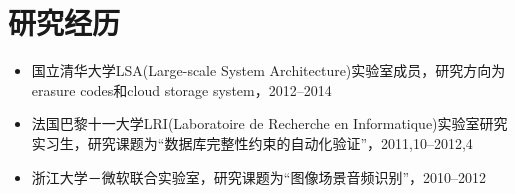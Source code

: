 \documentclass[letterpaper]{article}
\begin{document}
\section*{研究经历}

\begin{itemize}
\item 国立清华大学LSA(Large-scale System Architecture)实验室成员，研究方向为erasure codes和cloud storage system，2012--2014
\item 法国巴黎十一大学LRI(Laboratoire de Recherche en Informatique)实验室研究实习生，研究课题为“数据库完整性约束的自动化验证”，2011,10--2012,4
\item 浙江大学－微软联合实验室，研究课题为“图像场景音频识别”，2010--2012

\end{itemize}
\end{document}
